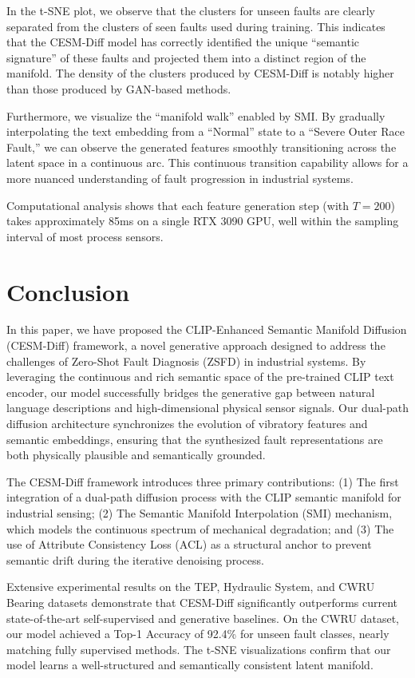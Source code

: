 \documentclass[journal]{IEEEtran}
\begin{document}
In the t-SNE plot, we observe that the clusters for unseen faults are clearly separated from the clusters of seen faults used during training. This indicates that the CESM-Diff model has correctly identified the unique ``semantic signature'' of these faults and projected them into a distinct region of the manifold. The density of the clusters produced by CESM-Diff is notably higher than those produced by GAN-based methods.

Furthermore, we visualize the ``manifold walk'' enabled by SMI. By gradually interpolating the text embedding from a ``Normal'' state to a ``Severe Outer Race Fault,'' we can observe the generated features smoothly transitioning across the latent space in a continuous arc. This continuous transition capability allows for a more nuanced understanding of fault progression in industrial systems.

Computational analysis shows that each feature generation step (with $T=200$) takes approximately 85ms on a single RTX 3090 GPU, well within the sampling interval of most process sensors.

\section{Conclusion}
\label{sec:conclusion}

In this paper, we have proposed the CLIP-Enhanced Semantic Manifold Diffusion (CESM-Diff) framework, a novel generative approach designed to address the challenges of Zero-Shot Fault Diagnosis (ZSFD) in industrial systems. By leveraging the continuous and rich semantic space of the pre-trained CLIP text encoder, our model successfully bridges the generative gap between natural language descriptions and high-dimensional physical sensor signals. Our dual-path diffusion architecture synchronizes the evolution of vibratory features and semantic embeddings, ensuring that the synthesized fault representations are both physically plausible and semantically grounded.

The CESM-Diff framework introduces three primary contributions: (1) The first integration of a dual-path diffusion process with the CLIP semantic manifold for industrial sensing; (2) The Semantic Manifold Interpolation (SMI) mechanism, which models the continuous spectrum of mechanical degradation; and (3) The use of Attribute Consistency Loss (ACL) as a structural anchor to prevent semantic drift during the iterative denoising process.

Extensive experimental results on the TEP, Hydraulic System, and CWRU Bearing datasets demonstrate that CESM-Diff significantly outperforms current state-of-the-art self-supervised and generative baselines. On the CWRU dataset, our model achieved a Top-1 Accuracy of 92.4\% for unseen fault classes, nearly matching fully supervised methods. The t-SNE visualizations confirm that our model learns a well-structured and semantically consistent latent manifold.
\end{document}
